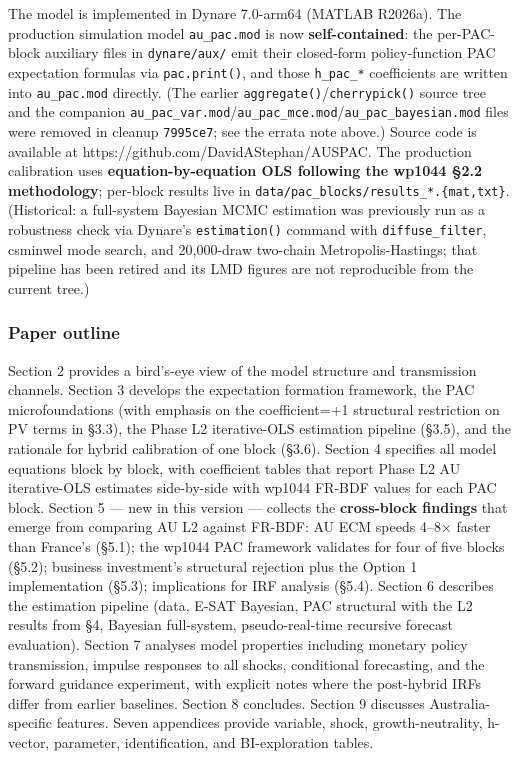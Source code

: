 \documentclass[
]{article}
\begin{document}
The model is implemented in Dynare 7.0-arm64 (MATLAB R2026a). The
production simulation model \texttt{au\_pac.mod} is now
\textbf{self-contained}: the per-PAC-block auxiliary files in
\texttt{dynare/aux/} emit their closed-form policy-function PAC
expectation formulas via \texttt{pac.print()}, and those
\texttt{h\_pac\_*} coefficients are written into \texttt{au\_pac.mod}
directly. (The earlier \texttt{aggregate()}/\texttt{cherrypick()} source
tree and the companion
\texttt{au\_pac\_var.mod}/\texttt{au\_pac\_mce.mod}/\texttt{au\_pac\_bayesian.mod}
files were removed in cleanup \texttt{7995ce7}; see the errata note
above.) Source code is available at
https://github.com/DavidAStephan/AUSPAC. The production calibration uses
\textbf{equation-by-equation OLS following the wp1044 §2.2 methodology};
per-block results live in
\texttt{data/pac\_blocks/results\_*.\{mat,txt\}}. (Historical: a
full-system Bayesian MCMC estimation was previously run as a robustness
check via Dynare's \texttt{estimation()} command with
\texttt{diffuse\_filter}, csminwel mode search, and 20,000-draw
two-chain Metropolis-Hastings; that pipeline has been retired and its
LMD figures are not reproducible from the current tree.)

\subsubsection{Paper outline}\label{paper-outline}

Section 2 provides a bird's-eye view of the model structure and
transmission channels. Section 3 develops the expectation formation
framework, the PAC microfoundations (with emphasis on the coefficient=+1
structural restriction on PV terms in §3.3), the Phase L2 iterative-OLS
estimation pipeline (§3.5), and the rationale for hybrid calibration of
one block (§3.6). Section 4 specifies all model equations block by
block, with coefficient tables that report Phase L2 AU iterative-OLS
estimates side-by-side with wp1044 FR-BDF values for each PAC block.
Section 5 --- new in this version --- collects the \textbf{cross-block
findings} that emerge from comparing AU L2 against FR-BDF: AU ECM speeds
4--8× faster than France's (§5.1); the wp1044 PAC framework validates
for four of five blocks (§5.2); business investment's structural
rejection plus the Option 1 implementation (§5.3); implications for IRF
analysis (§5.4). Section 6 describes the estimation pipeline (data,
E-SAT Bayesian, PAC structural with the L2 results from §4, Bayesian
full-system, pseudo-real-time recursive forecast evaluation). Section 7
analyses model properties including monetary policy transmission,
impulse responses to all shocks, conditional forecasting, and the
forward guidance experiment, with explicit notes where the post-hybrid
IRFs differ from earlier baselines. Section 8 concludes. Section 9
discusses Australia-specific features. Seven appendices provide
variable, shock, growth-neutrality, h-vector, parameter, identification,
and BI-exploration tables.
\end{document}
